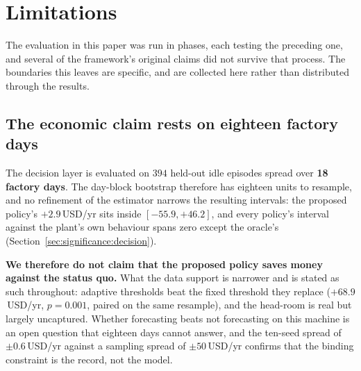 %
%
%
%

\section{Limitations}
\label{sec:limitations}
\label{sec:discussion}

The evaluation in this paper was run in phases, each testing the
preceding one, and several of the framework's original claims did not
survive that process. The boundaries this leaves are specific, and are
collected here rather than distributed through the results.

\subsection{The economic claim rests on eighteen factory days}
\label{sec:limitations:sample}

The decision layer is evaluated on $394$ held-out idle episodes spread
over \textbf{18 factory days}. The day-block bootstrap therefore has
eighteen units to resample, and no refinement of the estimator narrows
the resulting intervals: the proposed policy's $+2.9$\,USD/yr sits
inside $[-55.9,+46.2]$, and every policy's interval against the plant's
own behaviour spans zero except the oracle's
(Section~\ref{sec:significance:decision}).

\textbf{We therefore do not claim that the proposed policy saves money
against the status quo.} What the data support is narrower and is stated
as such throughout: adaptive thresholds beat the fixed threshold they
replace ($+68.9$\,USD/yr, $p=0.001$, paired on the same resample), and
the head-room is real but largely uncaptured. Whether forecasting beats
not forecasting on this machine is an open question that eighteen days
cannot answer, and the ten-seed spread of $\pm0.6$\,USD/yr against a
sampling spread of $\pm50$\,USD/yr confirms that the binding constraint
is the record, not the model.

